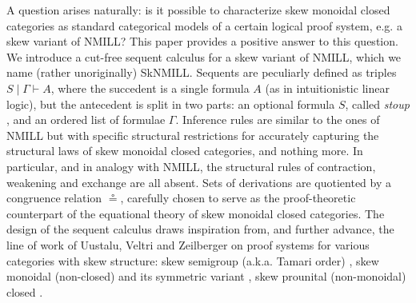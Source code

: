 \documentclass[submission,copyright,creativecommons]{eptcs}
\begin{document}
A question arises naturally: is it possible to characterize skew monoidal closed categories as standard categorical models of a certain logical proof system, e.g. a skew variant of NMILL?
This paper provides a positive answer to this question. We introduce a cut-free sequent calculus for a skew variant of NMILL, which we name (rather unoriginally) SkNMILL. Sequents are peculiarly defined as triples $S \mid \Gamma \vdash A$, where the succedent is a single formula $A$ (as in intuitionistic linear logic), but the antecedent is split in two parts: an optional formula $S$, called \emph{stoup} \cite{girard:constructive:91}, and an ordered list of formulae $\Gamma$. Inference rules are similar to the ones of NMILL but with specific structural restrictions for accurately capturing the structural laws of skew monoidal closed categories, and nothing more. In particular, and in analogy with NMILL, the structural rules of contraction, weakening and exchange are all absent. Sets of derivations are quotiented by a congruence relation $\circeq$, carefully chosen to serve as the proof-theoretic counterpart of the equational theory of skew monoidal closed categories. The design of the sequent calculus draws inspiration from, and further advance, the line of work of Uustalu, Veltri and Zeilberger on proof systems for various categories with skew structure: skew semigroup (a.k.a. Tamari order) \cite{zeilberger:semiassociative:19}, skew monoidal (non-closed) \cite{uustalu:sequent:2018,uustalu:proof:nodate} and its symmetric variant \cite{veltri:coherence:2021}, skew prounital (non-monoidal) closed \cite{uustalu:deductive:nodate}.
\end{document}
